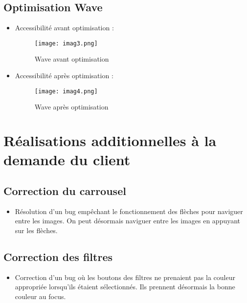 \documentclass[12pt, a4paper]{article}
\begin{document}
\subsection{Optimisation Wave}
\begin{itemize}
    \item Accessibilité avant optimisation :
    \begin{figure}[h!] %
    \centering %
    \texttt{[image: imag3.png]} %
    \caption{Wave avant optimisation} %
    \label{imag3.png} %
    \end{figure}
    \newpage
    \item Accessibilité après optimisation :
    \begin{figure}[h!] %
    \centering %
    \texttt{[image: imag4.png]} %
    \caption{Wave après optimisation} %
    \label{imag3.png} %
    \end{figure}
\end{itemize}

\newpage
\section{Réalisations additionnelles à la demande du client}
\subsection{Correction du carrousel}
\begin{itemize}
    \item Résolution d'un bug empêchant le fonctionnement des flèches pour naviguer entre les images. On peut désormais naviguer entre les images en appuyant sur les flèches.
\end{itemize}

\subsection{Correction des filtres}
\begin{itemize}
    \item Correction d'un bug où les boutons des filtres ne prenaient pas la couleur appropriée lorsqu'ils étaient sélectionnés. Ils prennent désormais la bonne couleur au focus.
\end{itemize}
\end{document}
